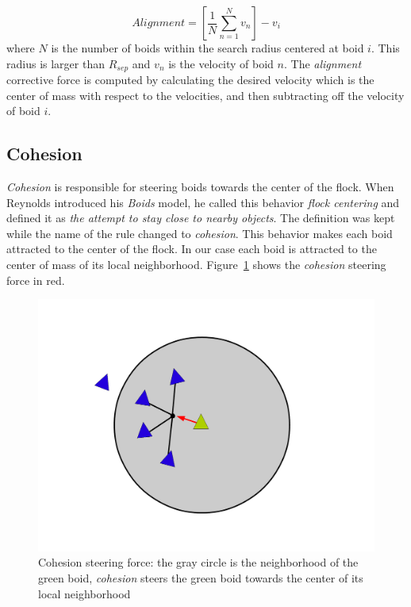 \begin{equation}
\label{alignmentEquation}
Alignment = \left[  \frac{1}{N} \sum_{n=1}^{N} v_n \right ] - v_i
\end{equation}
where $N$ is the number of boids within the search radius centered at boid $i$. This radius is larger than $R_{sep}$  and $v_n$ is the velocity of boid $n$. The \textit{alignment} corrective force is computed by calculating the desired velocity which is the center of mass with respect to the velocities, and then subtracting off the velocity of boid $i$.

\subsection{Cohesion}
\textit{Cohesion} is responsible for steering boids towards the center of the flock. When Reynolds introduced his \textit{Boids} model, he called this behavior \textit{flock centering} and defined it as \textit{the attempt to stay close to nearby objects}. The definition was kept while the name of the rule changed to \textit{cohesion}. This behavior makes each boid attracted to the center of the flock. In our case each boid is attracted to the center of mass of its local neighborhood.   Figure~\ref{cohesionPDF} shows the \textit{cohesion} steering force in red.

\begin{figure}[htbp]
\begin{center}
\includegraphics[scale=0.3]{figures/cohesion.pdf}
\caption{Cohesion steering force: the gray circle is the neighborhood of the green boid, \textit{cohesion} steers the green boid towards the center of its local neighborhood}
\label{cohesionPDF}
\end{center}
\end{figure}

